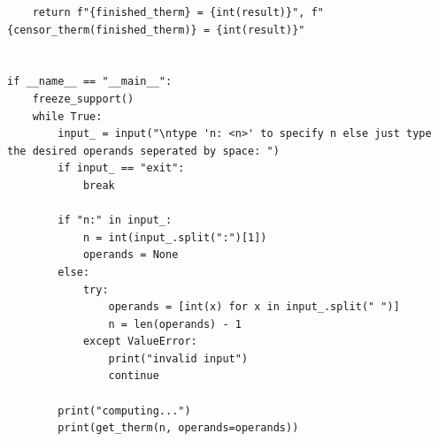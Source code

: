 \documentclass[a4paper,10pt,ngerman]{scrartcl}
\begin{document}
\begin{lstlisting}
    return f"{finished_therm} = {int(result)}", f"{censor_therm(finished_therm)} = {int(result)}"


if __name__ == "__main__":
    freeze_support()
    while True:
        input_ = input("\ntype 'n: <n>' to specify n else just type the desired operands seperated by space: ")
        if input_ == "exit":
            break

        if "n:" in input_:
            n = int(input_.split(":")[1])
            operands = None
        else:
            try:
                operands = [int(x) for x in input_.split(" ")]
                n = len(operands) - 1
            except ValueError:
                print("invalid input")
                continue

        print("computing...")
        print(get_therm(n, operands=operands))


\end{lstlisting}
\end{document}
